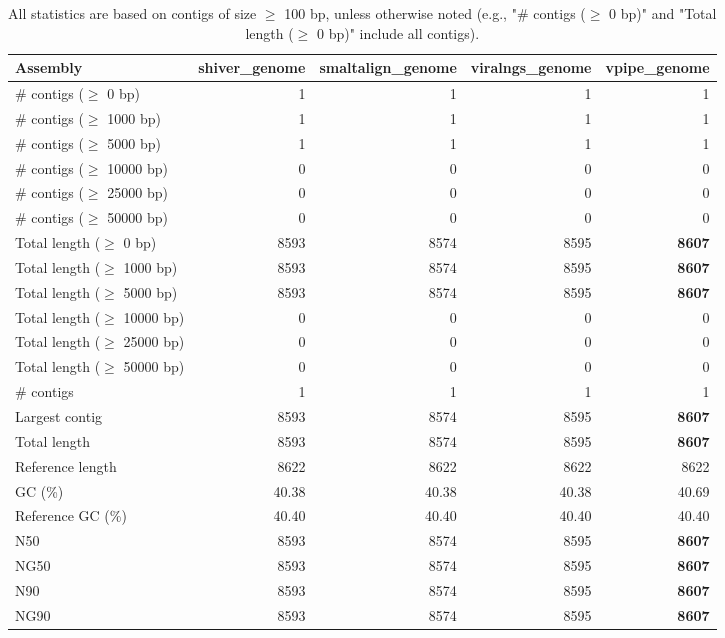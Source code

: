 \documentclass[12pt,a4paper]{article}
\begin{document}
\begin{table}[ht]
\begin{center}
\caption{All statistics are based on contigs of size $\geq$ 100 bp, unless otherwise noted (e.g., "\# contigs ($\geq$ 0 bp)" and "Total length ($\geq$ 0 bp)" include all contigs).}
\begin{tabular}{|l*{4}{|r}|}
\hline
Assembly & shiver\_genome & smaltalign\_genome & viralngs\_genome & vpipe\_genome \\ \hline
\# contigs ($\geq$ 0 bp) & 1 & 1 & 1 & 1 \\ \hline
\# contigs ($\geq$ 1000 bp) & 1 & 1 & 1 & 1 \\ \hline
\# contigs ($\geq$ 5000 bp) & 1 & 1 & 1 & 1 \\ \hline
\# contigs ($\geq$ 10000 bp) & 0 & 0 & 0 & 0 \\ \hline
\# contigs ($\geq$ 25000 bp) & 0 & 0 & 0 & 0 \\ \hline
\# contigs ($\geq$ 50000 bp) & 0 & 0 & 0 & 0 \\ \hline
Total length ($\geq$ 0 bp) & 8593 & 8574 & 8595 & {\bf 8607} \\ \hline
Total length ($\geq$ 1000 bp) & 8593 & 8574 & 8595 & {\bf 8607} \\ \hline
Total length ($\geq$ 5000 bp) & 8593 & 8574 & 8595 & {\bf 8607} \\ \hline
Total length ($\geq$ 10000 bp) & 0 & 0 & 0 & 0 \\ \hline
Total length ($\geq$ 25000 bp) & 0 & 0 & 0 & 0 \\ \hline
Total length ($\geq$ 50000 bp) & 0 & 0 & 0 & 0 \\ \hline
\# contigs & 1 & 1 & 1 & 1 \\ \hline
Largest contig & 8593 & 8574 & 8595 & {\bf 8607} \\ \hline
Total length & 8593 & 8574 & 8595 & {\bf 8607} \\ \hline
Reference length & 8622 & 8622 & 8622 & 8622 \\ \hline
GC (\%) & 40.38 & 40.38 & 40.38 & 40.69 \\ \hline
Reference GC (\%) & 40.40 & 40.40 & 40.40 & 40.40 \\ \hline
N50 & 8593 & 8574 & 8595 & {\bf 8607} \\ \hline
NG50 & 8593 & 8574 & 8595 & {\bf 8607} \\ \hline
N90 & 8593 & 8574 & 8595 & {\bf 8607} \\ \hline
NG90 & 8593 & 8574 & 8595 & {\bf 8607} \\ \hline

\end{tabular}
\end{center}
\end{table}
\end{document}
